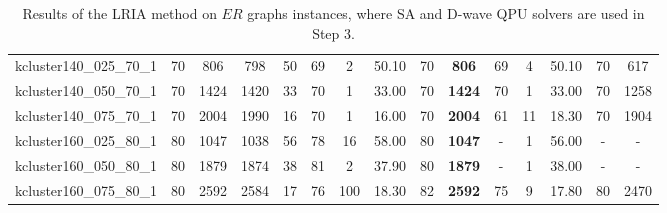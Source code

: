 \documentclass{article}
\begin{document}
\begin{landscape}
\begin{table}[]
{\begin{tabular}{l|cccc|ccccc|ccccc}
kcluster140\_025\_70\_1 & 70 & 806 & 798 & 50 & 69 & 2 & 50.10 & 70 & \textbf{806} & 69 & 4 & 50.10 & 70 & 617 \\
kcluster140\_050\_70\_1 & 70 & 1424 & 1420 & 33 & 70 & 1 & 33.00 & 70 & \textbf{1424} & 70 & 1 & 33.00 & 70 & 1258 \\
kcluster140\_075\_70\_1 & 70 & 2004 & 1990 & 16 & 70 & 1 & 16.00 & 70 & \textbf{2004} & 61 & 11 & 18.30 & 70 & 1904 \\
kcluster160\_025\_80\_1 & 80 & 1047 & 1038 & 56 & 78 & 16 & 58.00 & 80 & \textbf{1047} & - & 1 & 56.00 & - & - \\
kcluster160\_050\_80\_1 & 80 & 1879 & 1874 & 38 & 81 & 2 & 37.90 & 80 & \textbf{1879} & - & 1 & 38.00 & - & - \\
kcluster160\_075\_80\_1 & 80 & 2592 & 2584 & 17 & 76 & 100 & 18.30 & 82 & \textbf{2592} & 75 & 9 & 17.80 & 80 & 2470 \\

\hline
\end{tabular}
    }
    \caption{Results of the LRIA method on $ER$ graphs instances, where SA and D-wave QPU solvers are used in Step 3.}
    \label{tab: LRIA_ER_ins}
\end{table}

\begin{table}[]
    \centering
    \caption{Results of the LRIA method on $DW$ graphs instances, where SA and D-wave QPU solvers are used in Step 3.}
    \label{tab: LRIA_DW_ins}
\end{table}



\end{landscape}
\end{document}
